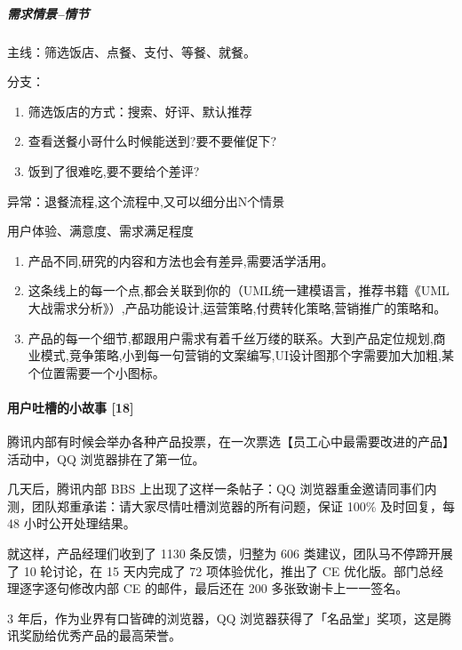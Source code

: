 \documentclass[letterpaper,11pt,english]{sphinxmanual}
\begin{document}
\subparagraph{需求情景–情节}
\label{\detokenize{chapter_knowledge/users_analysis:id25}}
主线：筛选饭店、点餐、支付、等餐、就餐。

分支：
\begin{enumerate}
%
\item {} 
筛选饭店的方式：搜索、好评、默认推荐

\item {} 
查看送餐小哥什么时候能送到?要不要催促下?

\item {} 
饭到了很难吃,要不要给个差评?

\end{enumerate}

异常：退餐流程,这个流程中,又可以细分出N个情景

用户体验、满意度、需求满足程度
\begin{enumerate}
%
\item {} 
产品不同,研究的内容和方法也会有差异,需要活学活用。

\item {} 
这条线上的每一个点,都会关联到你的（UML统一建模语言，推荐书籍《UML大战需求分析》）,产品功能设计,运营策略,付费转化策略,营销推广的策略和。

\item {} 
产品的每一个细节,都跟用户需求有着千丝万缕的联系。大到产品定位规划,商业模式,竞争策略,小到每一句营销的文案编写,UI设计图那个字需要加大加粗,某个位置需要一个小图标。

\end{enumerate}


\paragraph{用户吐槽的小故事 {[}18{]}}
\label{\detokenize{chapter_knowledge/users_analysis:id26}}
腾讯内部有时候会举办各种产品投票，在一次票选【员工心中最需要改进的产品】活动中，QQ
浏览器排在了第一位。

几天后，腾讯内部 BBS 上出现了这样一条帖子：QQ
浏览器重金邀请同事们内测，团队郑重承诺：请大家尽情吐槽浏览器的所有问题，保证
100\% 及时回复，每 48 小时公开处理结果。

就这样，产品经理们收到了 1130 条反馈，归整为 606
类建议，团队马不停蹄开展了 10 轮讨论，在 15 天内完成了 72
项体验优化，推出了 CE 优化版。部门总经理逐字逐句修改内部 CE
的邮件，最后还在 200 多张致谢卡上一一签名。

3 年后，作为业界有口皆碑的浏览器，QQ
浏览器获得了「名品堂」奖项，这是腾讯奖励给优秀产品的最高荣誉。
\end{document}
